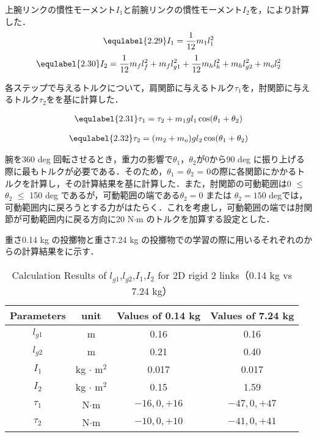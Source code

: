 上腕リンクの慣性モーメント$I_{1}$と前腕リンクの慣性モーメント$I_{2}$を，により計算した．
\begin{eqnarray}
  \equlabel{2.29}
  I_{1}=\frac{1}{12}m_{1}l_{1}^{2}
\end{eqnarray}
\begin{eqnarray}
  \equlabel{2.30}
  I_{2}=\frac{1}{12}m_{f}l_{f}^{2}+m_{f}l_{g1}^{2}+\frac{1}{12}m_{h}l_{h}^{2}+m_{h}l_{g2}^{2}+m_{o}l_{2}^{2}
\end{eqnarray}

各ステップで与えるトルクについて，肩関節に与えるトルク$\tau_{1}$を，肘関節に与えるトルク$\tau_{2}$をを基に計算した．

\begin{eqnarray}
  \equlabel{2.31}
  \tau_{1} = \tau_{2} + m_{1}gl_{1}\cos(\theta_{1} + \theta_{2})
\end{eqnarray}

\begin{eqnarray}
  \equlabel{2.32}
  \tau_{2} = (m_{2} + m_{o})gl_{2}\cos(\theta_{1} + \theta_{2})
\end{eqnarray}

腕を360 deg 回転させるとき，重力の影響で$\theta_{1}$，$\theta_{2}$が0から90 deg に振り上げる際に最もトルクが必要である．そのため，$\theta_{1}$ = $\theta_{2}$ = 0の際に各関節にかかるトルクを計算し，その計算結果を基に計算した．また，肘関節の可動範囲は0 $\le$ $\theta_{2}$ $\le$ 150 deg であるが，可動範囲の端である$\theta_{2} = 0$ または $\theta_{2} = 150$ degでは，可動範囲内に戻ろうとする力がはたらく．これを考慮し，可動範囲の端では肘関節が可動範囲内に戻る方向に20 N$\cdot$m のトルクを加算する設定とした．

重さ0.14 kg の投擲物と重さ7.24 kg の投擲物での学習の際に用いるそれぞれのからの計算結果をに示す．

\begin{table}[tb]
  \begin{center}
    \caption{Calculation Results of $l_{g1}$,$l_{g2}$,$I_{1}$,$I_{2}$ for 2D rigid 2 links（0.14 kg vs 7.24 kg）}
    \begin{tabular}{c|c|c|c}
      \hline
      Parameters & unit & Values of 0.14 kg & Values of 7.24 kg \\
      \hline
      $l_{g1}$ & m & 0.16 & 0.16 \\
      $l_{g2}$ & m & 0.21 & 0.40 \\
      $I_{1}$ & kg $\cdot$ $\mathrm{m}^2$ & 0.017 & 0.017 \\
      $I_{2}$ & kg $\cdot$ $\mathrm{m}^2$ & 0.15 & 1.59 \\
      $\tau_{1}$ & N$\cdot$m & $-16, 0, +16$ & $-47, 0, +47 $\\
      $\tau_{2}$ & N$\cdot$m & $-10, 0, +10$ & $-41, 0, +41 $\\
      \hline
    \end{tabular}
  \end{center}
\end{table}


